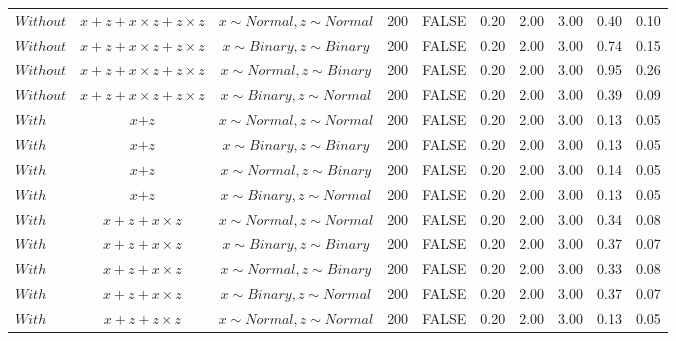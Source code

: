 \begin{table}[ht]
{\begin{tabular}{lccccccccc}
  $Without$ & $\textit{x} + \textit{z} + \textit{x} \times \textit{z} + \textit{z} \times \textit{z}$ & $\textit{x} \sim Normal , \textit{z} \sim Normal$ & 200 & FALSE & 0.20 & 2.00 & 3.00 & 0.40 & 0.10 \\ 
  $Without$ & $\textit{x} + \textit{z} + \textit{x} \times \textit{z} + \textit{z} \times \textit{z}$ & $\textit{x} \sim Binary, \textit{z} \sim Binary$ & 200 & FALSE & 0.20 & 2.00 & 3.00 & 0.74 & 0.15 \\ 
  $Without$ & $\textit{x} + \textit{z} + \textit{x} \times \textit{z} + \textit{z} \times \textit{z}$ & $\textit{x} \sim Normal, \textit{z} \sim Binary$ & 200 & FALSE & 0.20 & 2.00 & 3.00 & 0.95 & 0.26 \\ 
  $Without$ & $\textit{x} + \textit{z} + \textit{x} \times \textit{z} + \textit{z} \times \textit{z}$ & $\textit{x} \sim Binary, \textit{z} \sim Normal$ & 200 & FALSE & 0.20 & 2.00 & 3.00 & 0.39 & 0.09 \\ 
  $With$ & $\textit{x} + \textit{z}$ & $\textit{x} \sim Normal , \textit{z} \sim Normal$ & 200 & FALSE & 0.20 & 2.00 & 3.00 & 0.13 & 0.05 \\ 
  $With$ & $\textit{x} + \textit{z}$ & $\textit{x} \sim Binary, \textit{z} \sim Binary$ & 200 & FALSE & 0.20 & 2.00 & 3.00 & 0.13 & 0.05 \\ 
  $With$ & $\textit{x} + \textit{z}$ & $\textit{x} \sim Normal, \textit{z} \sim Binary$ & 200 & FALSE & 0.20 & 2.00 & 3.00 & 0.14 & 0.05 \\ 
  $With$ & $\textit{x} + \textit{z}$ & $\textit{x} \sim Binary, \textit{z} \sim Normal$ & 200 & FALSE & 0.20 & 2.00 & 3.00 & 0.13 & 0.05 \\ 
  $With$ & $\textit{x} + \textit{z} + \textit{x} \times \textit{z}$ & $\textit{x} \sim Normal , \textit{z} \sim Normal$ & 200 & FALSE & 0.20 & 2.00 & 3.00 & 0.34 & 0.08 \\ 
  $With$ & $\textit{x} + \textit{z} + \textit{x} \times \textit{z}$ & $\textit{x} \sim Binary, \textit{z} \sim Binary$ & 200 & FALSE & 0.20 & 2.00 & 3.00 & 0.37 & 0.07 \\ 
  $With$ & $\textit{x} + \textit{z} + \textit{x} \times \textit{z}$ & $\textit{x} \sim Normal, \textit{z} \sim Binary$ & 200 & FALSE & 0.20 & 2.00 & 3.00 & 0.33 & 0.08 \\ 
  $With$ & $\textit{x} + \textit{z} + \textit{x} \times \textit{z}$ & $\textit{x} \sim Binary, \textit{z} \sim Normal$ & 200 & FALSE & 0.20 & 2.00 & 3.00 & 0.37 & 0.07 \\ 
  $With$ & $\textit{x} + \textit{z} + \textit{z} \times \textit{z}$ & $\textit{x} \sim Normal , \textit{z} \sim Normal$ & 200 & FALSE & 0.20 & 2.00 & 3.00 & 0.13 & 0.05 \\ 

\end{tabular}}
\end{table}
